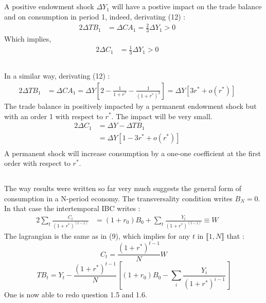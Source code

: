 \documentclass{article}
\begin{document}
\subsection{}
A positive endowment shock $\Delta Y_1$ will have a postive impact on the trade balance and on consumption in period 1, indeed, derivating (12) :
\begin{alignat}{2}
    \Delta TB_1 &= \Delta CA_1 = \frac{2}{3} \Delta Y_1  > 0 \quad&
\end{alignat}
Which implies,
\begin{alignat}{2}
    \Delta C_1 &= \frac{1}{3} \Delta Y_1  > 0 \quad&
\end{alignat}
\subsection{}
In a similar way, derivating (12) :
\begin{alignat}{2}
    \Delta TB_1 &= \Delta CA_1 = \Delta Y \left[2 - \frac{1}{1+r^*} - \frac{1}{(1+r^*)^2} \right] = \Delta Y \left[3 r^* + o(r^*)\right]\quad&
\end{alignat}
The trade balance in positively impacted by a permanent endowment shock but with an order 1 with respect to $r^*$. The impact will be very small.\newline
\begin{alignat*}{2}
    \Delta C_1 &= \Delta Y - \Delta TB_1 \quad&\\
    &= \Delta Y \left[1 - 3 r^* + o(r^*)\right]\quad&\\
\end{alignat*}
A permanent shock will increase consumption by a one-one coefficient at the first order with respect to $r^*$. 
\subsection{}
The way results were written so far very much suggests the general form of consumption in a N-period economy. The transversality condition writes $B_N = 0$.
In that case the intertemporal IBC writes :
\begin{alignat}{2}
    \sum_{t} \frac{C_t}{(1+r^*)^{(t-1)}} &= (1+r_0)B_0 + \sum_t \frac{Y_t}{(1+r^*)^{(t-1)}} \equiv W \quad&
\end{alignat}
The lagrangian is the same as in (9), which implies for any $t$ in $\llbracket 1, N \rrbracket$  that :
\begin{equation}{}
    C_t = \frac{(1+r^*)^{t-1}}{N}W 
\end{equation}
\begin{equation}{}
    TB_t = Y_t - \frac{(1+r^*)^{t-1}}{N} \left[ (1+r_0)B_0 - \sum_i \frac{Y_i}{(1+r^*)^{i-1}} \right]
    \label{tb_t}
\end{equation}
One is now able to redo question 1.5 and 1.6.\newline
\end{document}
